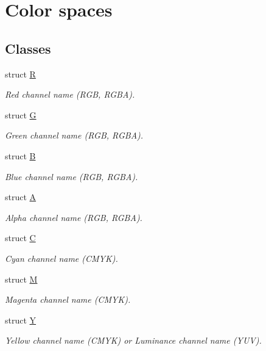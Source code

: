 \hypertarget{group___color_space}{\section{Color spaces}
\label{group___color_space}
}
\subsection*{Classes}
\begin{DoxyCompactItemize}
\item 
struct \hyperlink{struct_d_o_1_1_r}{R}
\begin{DoxyCompactList}\small\item\em Red channel name (R\-G\-B, R\-G\-B\-A). \end{DoxyCompactList}\item 
struct \hyperlink{struct_d_o_1_1_g}{G}
\begin{DoxyCompactList}\small\item\em Green channel name (R\-G\-B, R\-G\-B\-A). \end{DoxyCompactList}\item 
struct \hyperlink{struct_d_o_1_1_b}{B}
\begin{DoxyCompactList}\small\item\em Blue channel name (R\-G\-B, R\-G\-B\-A). \end{DoxyCompactList}\item 
struct \hyperlink{struct_d_o_1_1_a}{A}
\begin{DoxyCompactList}\small\item\em Alpha channel name (R\-G\-B, R\-G\-B\-A). \end{DoxyCompactList}\item 
struct \hyperlink{struct_d_o_1_1_c}{C}
\begin{DoxyCompactList}\small\item\em Cyan channel name (C\-M\-Y\-K). \end{DoxyCompactList}\item 
struct \hyperlink{struct_d_o_1_1_m}{M}
\begin{DoxyCompactList}\small\item\em Magenta channel name (C\-M\-Y\-K). \end{DoxyCompactList}\item 
struct \hyperlink{struct_d_o_1_1_y}{Y}
\begin{DoxyCompactList}\small\item\em Yellow channel name (C\-M\-Y\-K) or Luminance channel name (Y\-U\-V). \end{DoxyCompactList}\item 

\end{DoxyCompactItemize}
